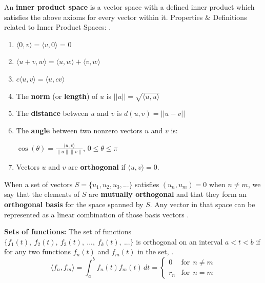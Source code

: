 \documentclass[10pt]{article}
\begin{document}
\vspace{2mm}

An \textbf{inner product space} is a vector space with a defined inner product which satisfies the above axioms for every vector within it. Properties \& Definitions related to Inner Product Spaces:  \cite{shields1968linearalgebra}.
\begin{enumerate}
    \item $\langle 0, v \rangle = \langle v, 0 \rangle$ = 0
    \item $\langle u + v, w \rangle = \langle u, w \rangle + \langle v, w \rangle$
    \item $c \langle u, v \rangle = \langle u, c v \rangle$
    \item The \textbf{norm} (or \textbf{length}) of $u$ is $||u|| = \sqrt{\langle u, u \rangle}$
    \item The \textbf{distance} between $u$ and $v$ is $d(u, v) = ||u-v||$
    \item The \textbf{angle} between two nonzero vectors $u$ and $v$ is: 
    
    $\cos(\theta) = \frac{\langle u, v \rangle}{\|u\| \|v\|}$, $0 \leq \theta \leq \pi$
    \item Vectors $u$ and $v$ are \textbf{orthogonal} if $\langle u, v \rangle = 0.$
\end{enumerate}

\vspace{2mm}

When a set of vectors $S = \{ u_1, u_2, u_3, ... \}$ satisfies $(u_n, u_m) = 0$ when $n \neq m$, we say that the elements of $S$ are \textbf{mutually orthogonal} and that they form an \textbf{orthogonal basis} for the space spanned by $S$.
Any vector in that space can be represented as a linear combination of those basis vectors  \cite{shields1968linearalgebra}.

\textbf{Sets of functions:} The set of functions $\{f_1(t),\:f_2(t),\:f_3(t),\:...,\:f_k(t),\:...\}$ is orthogonal on an interval $a < t < b$ if for any two functions $f_n(t)$ and $f_m(t)$ in the set, \cite{shields1968linearalgebra}.
\begin{equation} \label{eq:1.18}
    \langle f_n, f_m \rangle = \int_{a}^{b} f_n(t) f_m(t) \,dt = \begin{cases} 0 & \text{for} \:\: n \neq m \\ r_n & \text{for} \:\: n = m \end{cases}
\end{equation}
\end{document}

